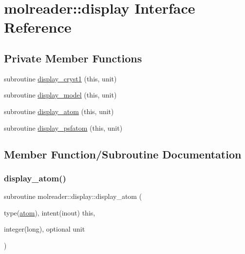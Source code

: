 \hypertarget{interfacemolreader_1_1display}{}\section{molreader\+:\+:display Interface Reference}
\label{interfacemolreader_1_1display}
\subsection*{Private Member Functions}
\begin{DoxyCompactItemize}
\item 
subroutine \hyperlink{interfacemolreader_1_1display_a367a91877524a939c53cd58ce8ac0635}{display\+\_\+cryst1} (this, unit)
\item 
subroutine \hyperlink{interfacemolreader_1_1display_af76b8884f32bae6a2a70d92dea1e884d}{display\+\_\+model} (this, unit)
\item 
subroutine \hyperlink{interfacemolreader_1_1display_a9e155fe19986dcbbceeccb957eb9eedb}{display\+\_\+atom} (this, unit)
\item 
subroutine \hyperlink{interfacemolreader_1_1display_a0f0d826e10fcae2957860b21580f136a}{display\+\_\+psfatom} (this, unit)
\end{DoxyCompactItemize}


\subsection{Member Function/\+Subroutine Documentation}
\mbox{\label{interfacemolreader_1_1display_a9e155fe19986dcbbceeccb957eb9eedb}} 
\subsubsection{\texorpdfstring{display\+\_\+atom()}{display\_atom()}}
{\footnotesize\ttfamily subroutine molreader\+::display\+::display\+\_\+atom (\begin{DoxyParamCaption}\item[{type(\hyperlink{structmolreader_1_1atom}{atom}), intent(inout)}]{this,  }\item[{integer(long), optional}]{unit }\end{DoxyParamCaption})\hspace{0.3cm}{\ttfamily [private]}}

